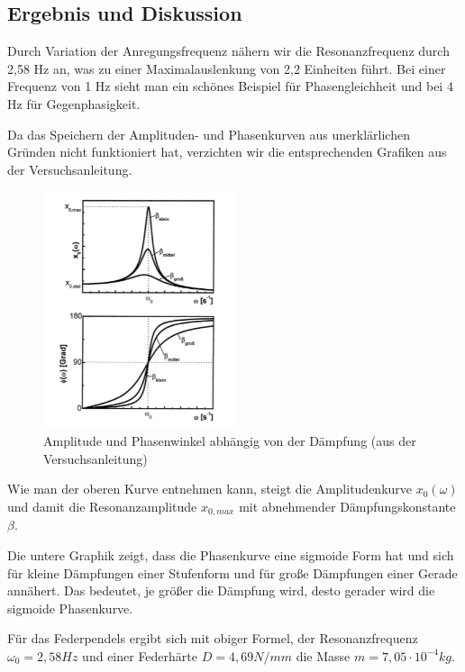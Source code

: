\documentclass{scrartcl}
\begin{document}
\subsection{Ergebnis und Diskussion}
Durch Variation der Anregungsfrequenz nähern wir die Resonanzfrequenz durch 2,58 Hz an, was zu einer Maximalauslenkung von 2,2 Einheiten führt. Bei einer Frequenz von 1 Hz sieht man ein schönes Beispiel für Phasengleichheit und bei 4 Hz für Gegenphasigkeit. 

Da das Speichern der Amplituden- und Phasenkurven aus unerklärlichen Gründen nicht funktioniert hat, verzichten wir die entsprechenden Grafiken aus der Versuchsanleitung.
\begin{figure}[h]
  \caption{Amplitude und Phasenwinkel abhängig von der Dämpfung (aus der Versuchsanleitung)}
  \centering
    \includegraphics[width=0.5\textwidth]{phasenkurve.png}
\end{figure}
Wie man der oberen Kurve entnehmen kann, steigt die Amplitudenkurve $x_{0}(\omega)$ und damit die Resonanzamplitude $x_{0,max}$ mit abnehmender Dämpfungskonstante $\beta$.

Die untere Graphik zeigt, dass die Phasenkurve eine sigmoide Form hat und sich für kleine Dämpfungen einer Stufenform und für große Dämpfungen einer Gerade annähert. Das bedeutet, je größer die Dämpfung wird, desto gerader wird die sigmoide Phasenkurve.

Für das Federpendels ergibt sich mit obiger Formel, der Resonanzfrequenz $\omega_{0} = 2,58 Hz$ und einer Federhärte $D = 4,69 N/mm$ die Masse $m = 7,05 \cdot 10^{-4}kg$.
\end{document}
